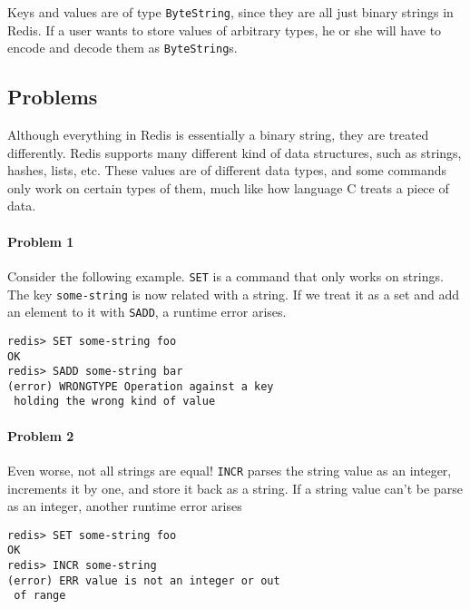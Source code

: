 \documentclass[pldi]{sigplanconf-pldi16}
\begin{document}
Keys and values are of type \texttt{ByteString}, since they are all
just binary strings in Redis. If a user wants to store values of
arbitrary types, he or she will have to encode and decode them as
 \texttt{ByteString}s.


\subsection{Problems}


Although everything in Redis is essentially a binary string, they are treated
differently. Redis supports many different kind of data structures, such as
strings, hashes, lists, etc. These values are of different data types, and some
commands only work on certain types of them, much like how language C treats
a piece of data.

\paragraph{Problem 1} Consider the following example. \texttt{SET} is
a command that only works on strings. The key \texttt{some-string} is
now related with a string. If we treat it as a set and add an element to it with
\texttt{SADD}, a runtime error arises.

\begin{verbatim}
redis> SET some-string foo
OK
redis> SADD some-string bar
(error) WRONGTYPE Operation against a key
 holding the wrong kind of value
\end{verbatim}

\paragraph{Problem 2} Even worse, not all strings are equal!
\texttt{INCR} parses the string value as an integer, increments it by
one, and store it back as a string. If a string value can't be parse as an
integer, another runtime error arises

\begin{verbatim}
redis> SET some-string foo
OK
redis> INCR some-string
(error) ERR value is not an integer or out
 of range
\end{verbatim}
\end{document}
